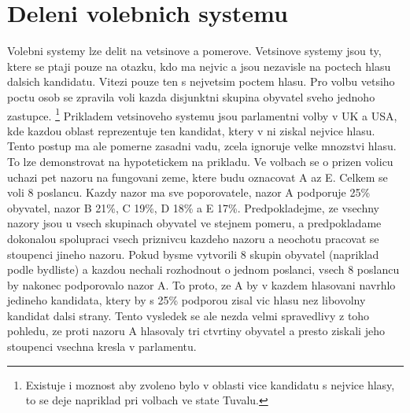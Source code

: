 \documentclass[12pt,a4paper]{scrreprt}
\begin{document}
\section{Deleni volebnich systemu}
Volebni systemy lze delit na vetsinove a pomerove. Vetsinove systemy jsou ty, ktere se ptaji pouze na otazku, kdo ma nejvic a jsou nezavisle na poctech hlasu dalsich kandidatu.
Vitezi pouze ten s nejvetsim poctem hlasu.
Pro volbu vetsiho poctu osob se zpravila voli kazda disjunktni skupina obyvatel sveho jednoho zastupce.
\footnote{Existuje i moznost aby zvoleno bylo v oblasti vice kandidatu s nejvice hlasy, to se deje napriklad pri volbach ve state Tuvalu.\autocite{TUV}}
Prikladem vetsinoveho systemu jsou parlamentni volby v UK a USA, kde kazdou oblast reprezentuje ten kandidat, ktery v ni ziskal nejvice hlasu.
Tento postup ma ale pomerne zasadni vadu, zcela ignoruje velke mnozstvi hlasu.
To lze demonstrovat na hypotetickem na prikladu. Ve volbach se o prizen volicu uchazi pet nazoru na fungovani zeme, ktere budu oznacovat A az E.
Celkem se voli 8 poslancu.
Kazdy nazor ma sve poporovatele, nazor A podporuje 25\% obyvatel, nazor B 21\%, C 19\%, D 18\% a E 17\%.
Predpokladejme, ze vsechny nazory jsou u vsech skupinach obyvatel ve stejnem pomeru, a predpokladame dokonalou spolupraci vsech priznivcu kazdeho nazoru a neochotu pracovat se stoupenci jineho nazoru.
Pokud bysme vytvorili 8 skupin obyvatel (napriklad podle bydliste) a kazdou nechali rozhodnout o jednom poslanci, vsech 8 poslancu by nakonec podporovalo nazor A.
To proto, ze A by v kazdem hlasovani navrhlo jedineho kandidata, ktery by s 25\% podporou zisal vic hlasu nez libovolny kandidat dalsi strany. 
Tento vysledek se ale nezda velmi spravedlivy z toho pohledu, ze proti nazoru A hlasovaly tri ctvrtiny obyvatel a presto ziskali jeho stoupenci vsechna kresla v parlamentu.
\end{document}
